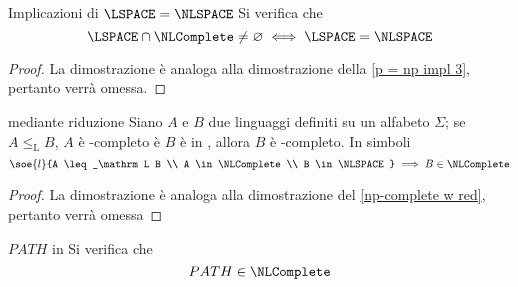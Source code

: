 \documentclass[a4paper, 12pt]{report}
\begin{document}
    \begin{framedprop}{Implicazioni di $\LSPACE = \NLSPACE$}
        Si verifica che $$\LSPACE \cap \NLComplete \neq \varnothing \iff \LSPACE = \NLSPACE$$
    \end{framedprop}

    \begin{proof}
        La dimostrazione è analoga alla dimostrazione della \cref{p = np impl 3}, pertanto verrà omessa.
    \end{proof}

    \begin{framedthm}[label={nl-complete w red}]{\NLComplete mediante riduzione}
        Siano $A$ e $B$ due linguaggi definiti su un alfabeto $\Sigma$; se $A \leq_\mathrm L B$, $A$ è \NLSPACE-completo è $B$ è in \NLSPACE, allora $B$ è \NLSPACE-completo. In simboli $$\soe{l}{A \leq_\mathrm L B \\ A \in \NLComplete \\ B \in \NLSPACE} \implies B \in \NLComplete$$
    \end{framedthm}
    
    \begin{proof}
        La dimostrazione è analoga alla dimostrazione del \cref{np-complete w red}, pertanto verrà omessa
    \end{proof}

    \begin{framedthm}[label={path in nl-complete}]{$PATH$ in \NLComplete}
        Si verifica che $$PATH \in \NLComplete$$
    \end{framedthm}
\end{document}
